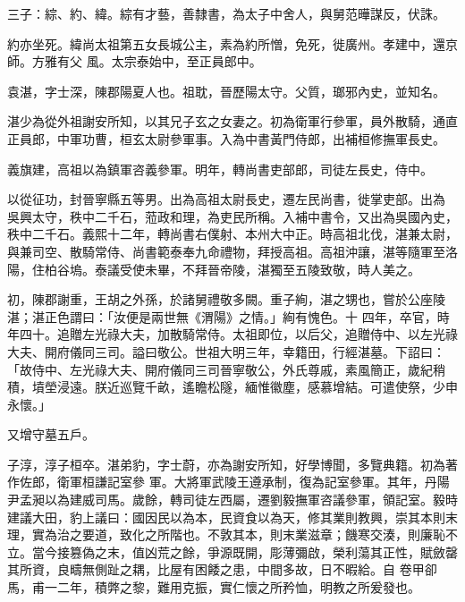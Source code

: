 \begin{pinyinscope}
 三子：綜、約、緯。綜有才藝，善隸書，為太子中舍人，與舅范曄謀反，伏誅。



 約亦坐死。緯尚太祖第五女長城公主，素為約所憎，免死，徙廣州。孝建中，還京師。方雅有父
 風。太宗泰始中，至正員郎中。



 袁湛，字士深，陳郡陽夏人也。祖耽，晉歷陽太守。父質，瑯邪內史，並知名。



 湛少為從外祖謝安所知，以其兄子玄之女妻之。初為衛軍行參軍，員外散騎，通直正員郎，中軍功曹，桓玄太尉參軍事。入為中書黃門侍郎，出補桓修撫軍長史。



 義旗建，高祖以為鎮軍咨義參軍。明年，轉尚書吏部郎，司徒左長史，侍中。



 以從征功，封晉寧縣五等男。出為高祖太尉長史，遷左民尚書，徙掌吏部。出為
 吳興太守，秩中二千石，蒞政和理，為吏民所稱。入補中書令，又出為吳國內史，秩中二千石。義熙十二年，轉尚書右僕射、本州大中正。時高祖北伐，湛兼太尉，與兼司空、散騎常侍、尚書範泰奉九命禮物，拜授高祖。高祖沖讓，湛等隨軍至洛陽，住柏谷塢。泰議受使未畢，不拜晉帝陵，湛獨至五陵致敬，時人美之。



 初，陳郡謝重，王胡之外孫，於諸舅禮敬多闕。重子絢，湛之甥也，嘗於公座陵湛；湛正色謂曰：「汝便是兩世無《渭陽》之情。」絢有愧色。十
 四年，卒官，時年四十。追贈左光祿大夫，加散騎常侍。太祖即位，以后父，追贈侍中、以左光祿大夫、開府儀同三司。謚曰敬公。世祖大明三年，幸籍田，行經湛墓。下詔曰：「故侍中、左光祿大夫、開府儀同三司晉寧敬公，外氏尊戚，素風簡正，歲紀稍積，墳塋浸遠。朕近巡覽千畝，遙瞻松隧，緬惟徽塵，感慕增結。可遣使祭，少申永懷。」



 又增守墓五戶。



 子淳，淳子桓卒。湛弟豹，字士蔚，亦為謝安所知，好學博聞，多覽典籍。初為著作佐郎，衛軍桓謙記室參
 軍。大將軍武陵王遵承制，復為記室參軍。其年，丹陽尹孟昶以為建威司馬。歲餘，轉司徒左西屬，遷劉毅撫軍咨議參軍，領記室。毅時建議大田，豹上議曰：國因民以為本，民資食以為天，修其業則教興，崇其本則末理，實為治之要道，致化之所階也。不敦其本，則末業滋章；饑寒交湊，則廉恥不立。當今接篡偽之末，值凶荒之餘，爭源既開，彫薄彌啟，榮利蕩其正性，賦斂罄其所資，良疇無側趾之耦，比屋有困餧之患，中間多故，日不暇給。自
 卷甲卻馬，甫一二年，積弊之黎，難用克振，實仁懷之所矜恤，明教之所爰發也。




\end{pinyinscope}

